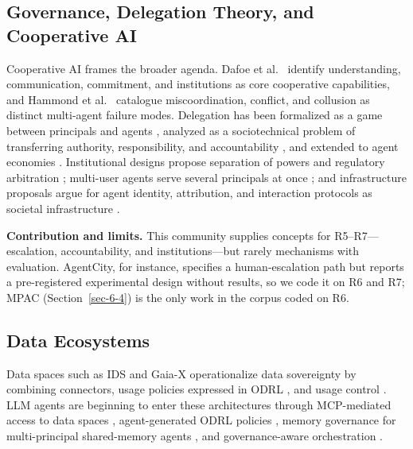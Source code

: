 \documentclass[conference]{IEEEtran}
\newcommand{\full}{{\small\CIRCLE}}
\newcommand{\half}{{\small\LEFTcircle}}
\begin{document}
\subsection{Governance, Delegation Theory, and Cooperative AI}\label{sec-6-6}

Cooperative AI frames the broader agenda. Dafoe et al.~\cite{dafoe2020open} identify understanding, communication, commitment, and institutions as core cooperative capabilities, and Hammond et al.~\cite{hammond2025multiagent} catalogue miscoordination, conflict, and collusion as distinct multi-agent failure modes. Delegation has been formalized as a game between principals and agents \cite{sourbut2024delegation}, analyzed as a sociotechnical problem of transferring authority, responsibility, and accountability \cite{tomasev2026intelligent}, and extended to agent economies \cite{tomasev2025virtual}. Institutional designs propose separation of powers \cite{ruan2026agentcity} and regulatory arbitration \cite{hu2025regulatory}; multi-user agents serve several principals at once \cite{yang2026multiuser}; and infrastructure proposals argue for agent identity, attribution, and interaction protocols as societal infrastructure \cite{chan2025infrastructure}.

\textbf{Contribution and limits.} This community supplies concepts for R5--R7---escalation, accountability, and institutions---but rarely mechanisms with evaluation. AgentCity, for instance, specifies a human-escalation path but reports a pre-registered experimental design without results, so we code it \half{} on R6 and R7; MPAC (Section~\ref{sec-6-4}) is the only work in the corpus coded \full{} on R6.

\subsection{Data Ecosystems}\label{sec-6-7}

Data spaces such as IDS and Gaia-X \cite{otto2022designing, pettenpohl2022ids, braud2021gaiax} operationalize data sovereignty by combining connectors, usage policies expressed in ODRL \cite{w3c2018odrl}, and usage control \cite{park2004ucon, lazouski2010ucsurvey, zrenner2019usagecontrol}. LLM agents are beginning to enter these architectures through MCP-mediated access to data spaces \cite{alonsoruiz2026bridging}, agent-generated ODRL policies \cite{zhong2025agentodrl}, memory governance for multi-principal shared-memory agents \cite{ren2026gatemem, johnson2026aim}, and governance-aware orchestration \cite{shukla2025multiagent}.
\end{document}
